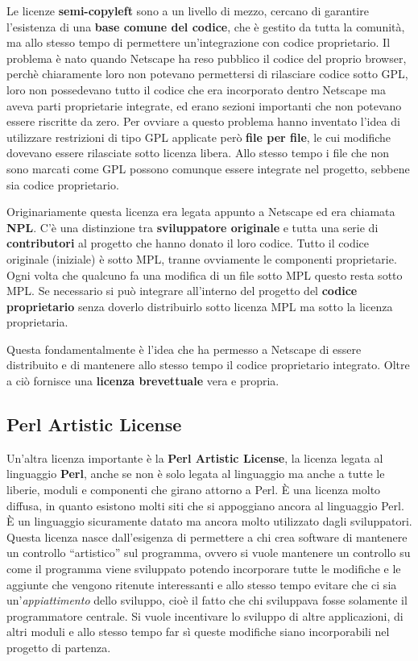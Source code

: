 Le licenze \textbf{semi-copyleft} sono a un livello di mezzo, cercano di garantire l'esistenza di una \textbf{base comune del codice}, che è gestito da tutta la comunità, ma allo stesso tempo di permettere un'integrazione con codice proprietario. Il problema è nato quando Netscape ha reso pubblico il codice del proprio browser, perchè chiaramente loro non potevano permettersi di rilasciare codice sotto GPL, loro non possedevano tutto il codice che era incorporato dentro Netscape ma aveva parti proprietarie integrate, ed erano sezioni importanti che non potevano essere riscritte da zero. Per ovviare a questo problema hanno inventato l'idea di utilizzare restrizioni di tipo GPL applicate però \textbf{file per file}, le cui modifiche dovevano essere rilasciate sotto licenza libera. Allo stesso tempo i file che non sono marcati come GPL possono comunque essere integrate nel progetto, sebbene sia codice proprietario.

Originariamente questa licenza era legata appunto a Netscape ed era chiamata \textbf{NPL}. C'è una distinzione tra \textbf{sviluppatore originale} e tutta una serie di \textbf{contributori} al progetto che hanno donato il loro codice. Tutto il codice originale (iniziale) è sotto MPL, tranne ovviamente le componenti proprietarie. Ogni volta che qualcuno fa una modifica di un file sotto MPL questo resta sotto MPL. Se necessario si può integrare all'interno del progetto del \textbf{codice proprietario} senza doverlo distribuirlo sotto licenza MPL ma sotto la licenza proprietaria.

Questa fondamentalmente è l'idea che ha permesso a Netscape di essere distribuito e di mantenere allo stesso tempo il codice proprietario integrato. Oltre a ciò fornisce una \textbf{licenza brevettuale} vera e propria.

\subsection{Perl Artistic License}

Un'altra licenza importante è la \textbf{Perl Artistic License}, la licenza legata al linguaggio \textbf{Perl}, anche se non è solo legata al linguaggio ma anche a tutte le liberie, moduli e componenti che girano attorno a Perl. È una licenza molto diffusa, in quanto esistono molti siti che si appoggiano ancora al linguaggio Perl. È un linguaggio sicuramente datato ma ancora molto utilizzato dagli sviluppatori. Questa licenza nasce dall'esigenza di permettere a chi crea software di mantenere un controllo ``artistico'' sul programma, ovvero si vuole mantenere un controllo su come il programma viene sviluppato potendo incorporare tutte le modifiche e le aggiunte che vengono ritenute interessanti e allo stesso tempo evitare che ci sia un'\textit{appiattimento} dello sviluppo, cioè il fatto che chi sviluppava fosse solamente il programmatore centrale. Si vuole incentivare lo sviluppo di altre applicazioni, di altri moduli e allo stesso tempo far sì queste modifiche siano incorporabili nel progetto di partenza. 

